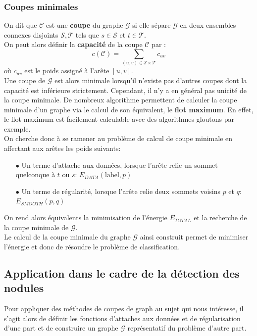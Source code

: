 \documentclass{article}
\newcommand{\G}{\mathcal{G}}
\newcommand{\lab}{\text{label}}
\begin{document}
\subsubsection{Coupes minimales}

On dit que $\mathcal{C}$ est une \textbf{coupe} du graphe $\G$ si elle sépare $\G$ en deux ensembles connexes disjoints $\mathcal{S},\mathcal{T}$ tels que  
$s \in \mathcal{S}$ et $t \in \mathcal{T}$.\\
On peut alors définir la \textbf{capacité} de la coupe $\mathcal{C}$ par :
\[
	c(\mathcal{C}) = \sum_{(u,v) \in \mathcal{S} \times \mathcal{T}} c_{uv}
\]
où $c_{uv}$ est le poids assigné à l'arête $[u,v]$.\\
Une coupe de $\G$ est alors minimale lorsqu'il n'existe pas d'autres coupes dont la capacité est inférieure strictement. Cependant, il n'y a en général pas unicité de la coupe minimale. De nombreux algorithme permettent de calculer la coupe minimale d'un graphe via le calcul de son équivalent, le \textbf{flot maximum}. En effet, le flot maximum est facilement calculable avec des algorithmes gloutons par exemple. \\
On cherche donc à se ramener au problème de calcul de coupe minimale en affectant aux arêtes les poids suivants:
\begin{itemize}
	\item[$\bullet$] Un terme d'attache aux données, lorsque l'arête relie un sommet quelconque à $t$ ou $s$: $E_{DATA}(\lab, p)$
	\item[$\bullet$] Un terme de régularité, lorsque l'arête relie deux sommets voisins $p$ et $q$: $E_{SMOOTH}(p,q)$
\end{itemize}
On rend alors équivalents la minimisation de l'énergie $E_{TOTAL}$ et la recherche de la coupe minimale de $\G$.\\
Le calcul de la coupe minimale du graphe $\G$ ainsi construit permet de minimiser l'énergie et donc de résoudre le problème de classification.

\subsection{Application dans le cadre de la détection des nodules}

Pour appliquer des méthodes de coupes de graph au sujet qui nous intéresse, il s'agit alors de définir les fonctions d'attaches aux données et de régularisation d'une part et de construire un graphe $\G$ représentatif du problème d'autre part.
\end{document}
